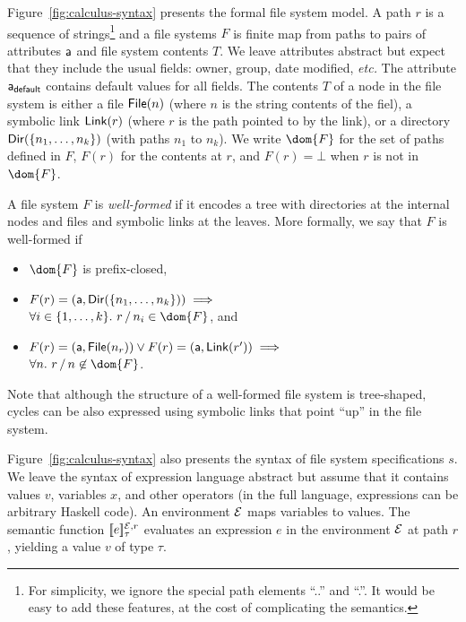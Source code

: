 %
Figure~\ref{fig:calculus-syntax} presents the formal file system
model. A path $r$ is a sequence of strings\footnote{For simplicity, we
  ignore the special path elements ``..'' and ``.''.  It would be easy
  to add these features, at the cost of complicating the semantics.}
and a file systems $F$ is finite map from paths to pairs of attributes
$\mathsf{a}$ and file system contents $T$.  We leave attributes abstract but
expect that they include the usual fields: owner, group, date
modified, {\it etc.}  The attribute $\mathsf{a}_{\mathsf{default}}$ contains default
values for all fields. The contents $T$ of a node in the file system
is either a file $\mathsf{File}(n)$ (where $n$ is the string contents of the
fiel), a symbolic link $\mathsf{Link}(r)$ (where $r$ is the path pointed to by
the link), or a directory $\mathsf{Dir}(\{ n_1,\dots,n_k \})$ (with paths
$n_1$ to $n_k$). We write $\dom{F}$ for the set of paths defined in
$F$, $F(r)$ for the contents at $r$, and $F(r) = \bot$ when $r$ is not
in $\dom{F}$.

A file system $F$ is {\em well-formed} if it encodes a tree with
directories at the internal nodes and files and symbolic links at the
leaves. More formally, we say that $F$ is well-formed if
%
\begin{itemize}
\item $\dom{F}$ is prefix-closed,
\item $F(r) = (\mathsf{a},\mathsf{Dir}( \{ n_1,\dots,n_k \} )) \implies$\\ \hspace*{3.3mm}$\forall i \in \{1,\dots,k\}.~\PCons{r}{n_i} \in \dom{F}$, and
\item $F(r) = (\mathsf{a},\mathsf{File}(n_r)) \vee F(r) = (\mathsf{a},\mathsf{Link}(r')) \implies$\\ \hspace*{3.3mm}$\forall n.~\PCons{r}{n} \not\in \dom{F}$.
\end{itemize}
%
Note that although the structure of a well-formed file system is
tree-shaped, cycles can be also expressed using symbolic links that
point ``up'' in the file system.

%
Figure~\ref{fig:calculus-syntax} also presents the syntax of file system
specifications $s$.  We leave the syntax of expression language
abstract but assume that it contains values $v$, variables $x$, and
other operators (in the full \forest{} language, expressions can be
arbitrary Haskell code).  An environment $\mathcal{E}$ maps variables to
values.  The semantic function $[\![e]\!]^{\mathcal{E},r}_{\tau}$ evaluates an
expression $e$ in the environment $\mathcal{E}$ at path $r$, yielding a value
$v$ of type $\tau$.

